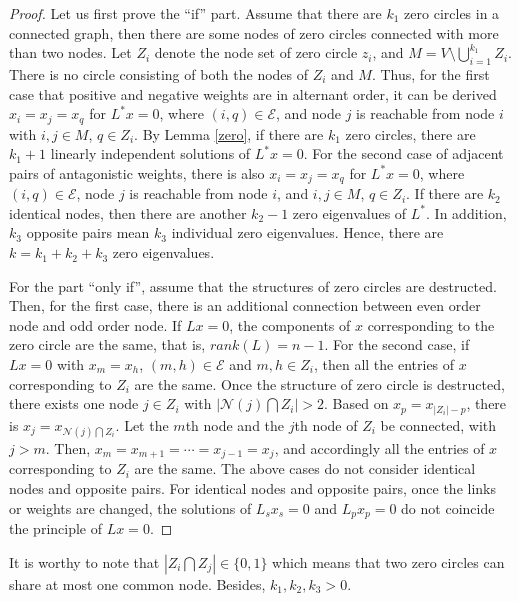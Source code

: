 \documentclass[a4paper,11pt]{article}
\begin{document}
\begin{proof}
Let us first prove the ``if'' part.  Assume that there are $k_1$ zero circles in a connected graph, then there are some nodes of zero circles connected with more than two nodes. Let $Z_i$ denote the node set of zero circle $z_i$, and $M=V\setminus \bigcup_{i=1}^{k_1} Z_i$. There is no circle consisting of both the nodes of $Z_i$ and $M$. Thus, for the first case that positive and negative weights are in alternant order, it can be derived $x_i=x_j=x_q$ for $L^*x=0$, where $(i,q)\in\mathcal{E}$, and node $j$ is reachable from node $i$ with $i,j\in M$, $q\in Z_i$. By Lemma \ref{zero}, if there are $k_1$ zero circles, there are $k_1+1$ linearly independent solutions of $L^*x=0$. For the second case of adjacent pairs of antagonistic weights, there is also $x_i=x_j=x_q$ for $L^*x=0$, where $(i,q)\in\mathcal{E}$, node $j$ is reachable from node $i$, and $i,j\in M$, $q\in Z_i$. If there are $k_2$ identical nodes, then there are another $k_2-1$ zero eigenvalues of $L^*.$ In addition, $k_3$ opposite pairs mean $k_3$ individual zero eigenvalues. Hence, there are $k=k_1+k_2+k_3$ zero eigenvalues.

For the part ``only if'', assume that the structures of zero circles are destructed. Then, for the first case, there is an additional connection between even order node and odd order node. If $Lx=0$, the components of $x$ corresponding to the zero circle are the same, that is, $rank(L)=n-1.$ For the second case, if $Lx=0$ with $x_m=x_h$, $(m,h)\in\mathcal{E}$ and $m,h\in Z_i$, then all the entries of $x$ corresponding to $Z_i$ are the same. Once the structure of zero circle is destructed, there exists one node $j\in Z_i$ with $|\mathcal{N}(j)\bigcap Z_i|>2$. Based on $x_p=x_{|Z_i|-p}$, there is  $x_j=x_{\mathcal{N}(j)\bigcap Z_i}$. Let the $m$th node and the $j$th node of $Z_i$ be connected, with $j>m$. Then, $x_m=x_{m+1}=\cdots=x_{j-1}=x_{j}$, and accordingly all the entries of $x$ corresponding to $Z_i$ are the same. The above cases do not consider identical nodes and opposite pairs. For identical nodes and opposite pairs, once the links or weights are changed, the solutions of $L_sx_s=0$ and $L_px_p=0$ do not coincide the principle of $Lx=0.$
\end{proof}
\begin{remark}
It is worthy to note that $|Z_i\bigcap Z_j|\in\{0,1\}$ which means that two zero circles can share at most one common node. Besides, $k_1,k_2,k_3>0.$
\end{remark}
\end{document}

